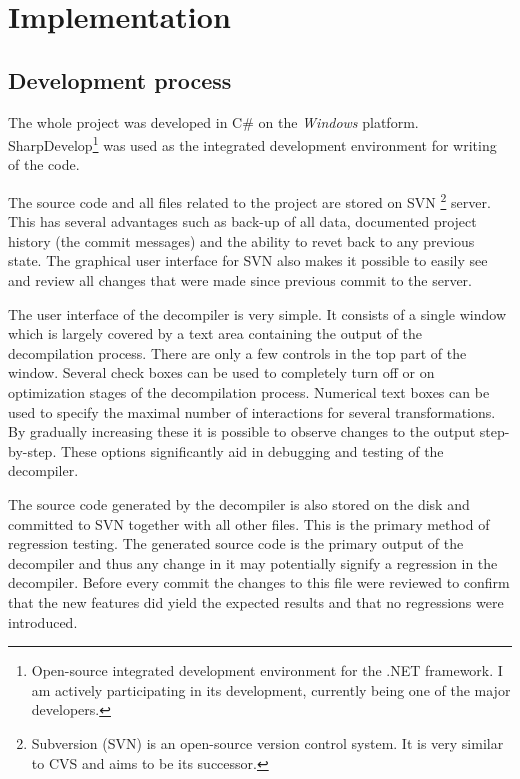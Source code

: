 \documentclass[12pt,twoside,notitlepage]{report}
\begin{document}
\cleardoublepage
\chapter{Implementation}

\section{Development process}

The whole project was developed in C\# on the \emph{Windows} platform.
SharpDevelop\footnote{Open-source integrated development environment
for the .NET framework.  I am actively participating in its development,
currently being one of the major developers.}
was used as the integrated development environment for writing of the code.

The source code and all files related to the project are stored on SVN%
\footnote{Subversion (SVN) is an open-source version control system.
It is very similar to CVS and aims to be its successor.}
server.  This has several advantages such as back-up of all data, 
documented project history (the commit messages) and the ability 
to revet back to any previous state.  The graphical user interface
for SVN also makes it possible to easily see and review all changes 
that were made since previous commit to the server.

The user interface of the decompiler is very simple.
It consists of a single window which is largely covered by a text area
containing the output of the decompilation process.
There are only a few controls in the top part of the window.
Several check boxes can be used to completely turn off or on 
optimization stages of the decompilation process.
Numerical text boxes can be used to specify the maximal number of
interactions for several transformations.  By gradually increasing
these it is possible to observe changes to the output step-by-step.
These options significantly aid in debugging and testing of 
the decompiler.

The source code generated by the decompiler is also stored on
the disk and committed to SVN together with all other files.
This is the primary method of regression testing.  The generated source code
is the primary output of the decompiler and thus any change 
in it may potentially signify a regression in the decompiler.
Before every commit the changes to this file were reviewed
to confirm that the new features did yield the expected 
results and that no regressions were introduced.
\end{document}

